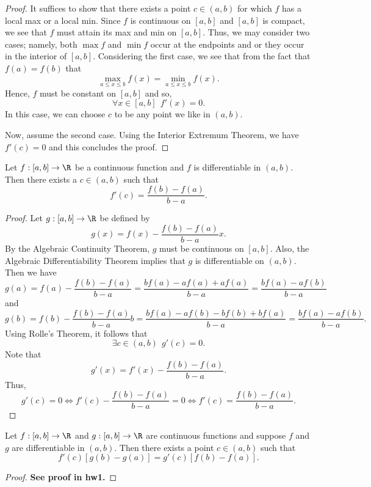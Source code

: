 \begin{proof}
    It suffices to show that there exists a point \( c \in (a,b)  \) for which \( f  \) has a local max or a local min. Since \( f  \) is continuous on \( [a,b] \) and \( [a,b]  \) is compact, we see that \( f  \) must attain its max and min on \( [a,b] \). Thus, we may consider two cases; namely, both \( \max f  \) and \( \min f  \) occur at the endpoints and or they occur in the interior of \( [a,b] \). Considering the first case, we see that from the fact that \( f(a) = f(b) \) that   
    \[  \max_{a \leq x \leq b } f(x) = \min_{a \leq x \leq b } f(x). \]
    Hence, \( f \) must be constant on \( [a,b] \) and so, 
    \[  \forall  x \in [a,b] \ \ f'(x) = 0.  \]
    In this case, we can choose \( c  \) to be any point we like in \( (a,b) \).  

    Now, assume the second case. Using the Interior Extremum Theorem, we have \( f'(c) = 0  \) and this concludes the proof.  
\end{proof}

\begin{theorem}
    Let \( f: [a,b] \to \R  \) be a continuous function and \( f  \) is differentiable in \( (a,b) \). Then there exists a \( c \in (a,b)  \) such that 
    \[  f'(c) = \frac{ f(b) - f(a) }{  b - a  }. \]
\end{theorem}
\begin{proof}
    Let \( g:[a,b] \to \R  \) be defined by
    \[  g(x) = f(x) - \frac{ f(b) - f(a)  }{  b - a  }  x.  \]
    By the Algebraic Continuity Theorem, \( g  \) must be continuous on \( [a,b] \). Also, the Algebraic Differentiability Theorem implies that \( g  \) is differentiable on \( (a,b) \). Then we have  
    \[  g(a) = f(a) - \frac{ f(b) - f(a) }{  b -a  } = \frac{ b f(a) - a f(a) + a f(a)  }{  b - a  }  = \frac{ bf(a) - a f(b)  }{  b - a  }  \]
    and 
    \[  g(b) = f(b) - \frac{ f(b) - f(a) }{ b - a  } b = \frac{ b f(a) - a f(b) - b f(b) + b f(a) }{  b -a   }  = \frac{ b f(a) - a f(b)  }{  b -a  }. \]
    Using Rolle's Theorem, it follows that 
    \[  \exists c \in (a,b) \ \ g'(c) = 0.  \]
    Note that 
    \[  g'(x) = f'(x) - \frac{ f(b) - f(a) }{ b - a  }. \]
    Thus, 
    \[  g'(c) = 0  \iff f'(c) - \frac{ f(b) - f(a) }{  b -a  }  = 0  \iff f'(c) = \frac{ f(b) -f(a)  }{ b - a  }. \]
\end{proof}  

\begin{theorem}
    Let \( f: [a,b] \to \R  \) and \( g : [a,b] \to \R  \) are continuous functions and suppose \( f  \) and \( g  \) are differentiable in \( (a,b) \). Then there exists a point \( c \in (a,b) \) such that 
    \[  f'(c) [g(b) - g(a)] = g'(c) [f(b) - f(a)]. \]
\end{theorem}
\begin{proof}
    \textbf{See proof in hw1.}
\end{proof}

